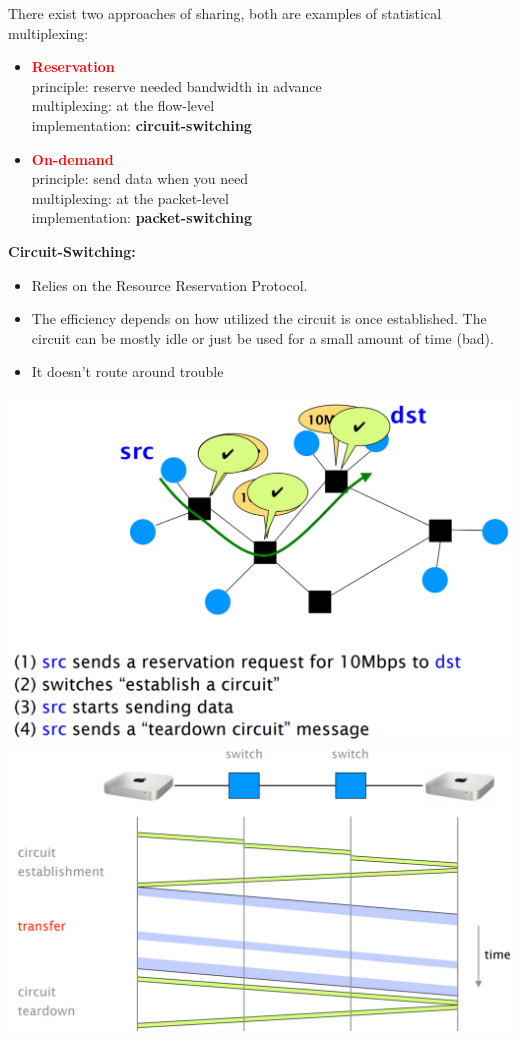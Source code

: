 \documentclass[a4paper, fontsize=8pt, landscape, DIV=1]{scrartcl}
\begin{document}
\begin{multicols*}{4}
				There exist two approaches of sharing, both are examples of statistical multiplexing: 
				\begin{itemize}
					\item \textcolor{red}{\textbf{Reservation}}\\
						  principle: reserve needed bandwidth in advance\\
						  multiplexing: at the flow-level\\
						  implementation: \textbf{circuit-switching}  
					\item \textcolor{red}{\textbf{On-demand}}\\
						  principle: send data when you need\\
						  multiplexing: at the packet-level\\
						  implementation: \textbf{packet-switching}
				\end{itemize}
				\textbf{Circuit-Switching:}
				\vspace{-0.5cm}
				\begin{itemize}[noitemsep]
					\item Relies on the Resource Reservation Protocol.
					\item The efficiency depends on how utilized the circuit is once established. The circuit can be mostly idle or just be used for a small amount of time (bad).
					\item It doesn't route around trouble 
				\end{itemize}
				\includegraphics[width=\columnwidth]{images/Overview/circuit_switching.png}
				\includegraphics[width=\columnwidth]{images/Overview/circuit_switching_transfer.png}

\end{multicols*}
\end{document}
